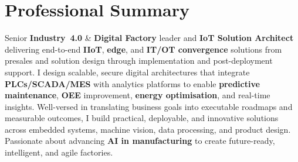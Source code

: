 \documentclass[11pt,a4paper,sans]{moderncv} %
\newcommand{\kw}[1]{\textbf{#1}}
\begin{document}
\makecvtitle
\vspace*{-1.5\baselineskip} %

\section{Professional Summary}
\begin{justify}
Senior \kw{Industry~4.0} \& \kw{Digital Factory} leader and \kw{IoT Solution Architect} delivering end-to-end \kw{IIoT}, \kw{edge}, and \kw{IT/OT convergence} solutions from presales and solution design through implementation and post-deployment support. I design scalable, secure digital architectures that integrate \kw{PLCs/SCADA/MES} with analytics platforms to enable \kw{predictive maintenance}, \kw{OEE} improvement, \kw{energy optimisation}, and real-time insights. Well-versed in translating business goals into executable roadmaps and measurable outcomes, I build practical, deployable, and innovative solutions across embedded systems, machine vision, data processing, and product design. Passionate about advancing \kw{AI in manufacturing} to create future-ready, intelligent, and agile factories.
\end{justify}

\end{document}
